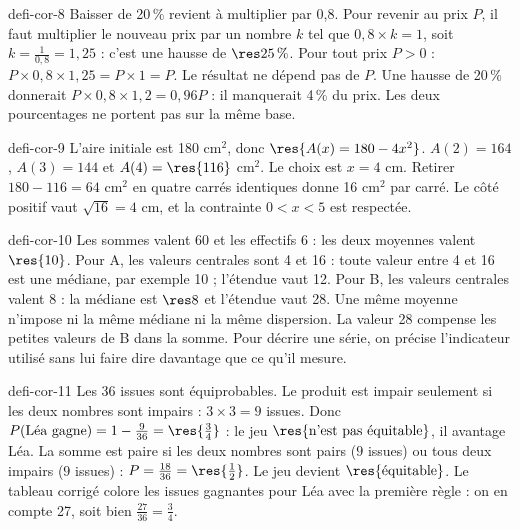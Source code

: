 \begin{blocEdition}{defi-cor-8}
Baisser de 20\,\% revient à multiplier par 0,8. Pour revenir au prix $P$, il faut multiplier le nouveau prix par un nombre $k$ tel que $0{,}8\times k=1$, soit $k=\frac1{0{,}8}=1{,}25$ : c’est une hausse de $\res{25\,\%}$.
Pour tout prix $P>0$ : $P\times0{,}8\times1{,}25=P\times1=P$. Le résultat ne dépend pas de $P$.
Une hausse de 20\,\% donnerait $P\times0{,}8\times1{,}2=0{,}96P$ : il manquerait 4\,\% du prix. Les deux pourcentages ne portent pas sur la même base.
\end{blocEdition}
\begin{blocEdition}{defi-cor-9}
L’aire initiale est 180 cm$^2$, donc $\res{A(x)=180-4x^2}$.
$A(2)=164$, $A(3)=144$ et $A(4)=\res{116}$ cm$^2$. Le choix est $x=4$ cm.
Retirer $180-116=64$ cm$^2$ en quatre carrés identiques donne 16 cm$^2$ par carré. Le côté positif vaut $\sqrt{16}=4$ cm, et la contrainte $0<x<5$ est respectée.\label{fig-defi-cor-9}

\end{blocEdition}
\begin{blocEdition}{defi-cor-10}
Les sommes valent 60 et les effectifs 6 : les deux moyennes valent $\res{10}$.
Pour A, les valeurs centrales sont 4 et 16 : toute valeur entre 4 et 16 est une médiane, par exemple 10 ; l’étendue vaut 12. Pour B, les valeurs centrales valent 8 : la médiane est $\res8$ et l’étendue vaut 28.
Une même moyenne n’impose ni la même médiane ni la même dispersion. La valeur 28 compense les petites valeurs de B dans la somme. Pour décrire une série, on précise l’indicateur utilisé sans lui faire dire davantage que ce qu’il mesure.
\end{blocEdition}
\begin{blocEdition}{defi-cor-11}
Les 36 issues sont équiprobables. Le produit est impair seulement si les deux nombres sont impairs : $3\times3=9$ issues. Donc $P(\text{Léa gagne})=1-\frac9{36}=\res{\frac34}$ : le jeu $\res{\text{n’est pas équitable}}$, il avantage Léa.
La somme est paire si les deux nombres sont pairs ($9$ issues) ou tous deux impairs ($9$ issues) : $P=\frac{18}{36}=\res{\frac12}$. Le jeu devient $\res{\text{équitable}}$.
Le tableau corrigé colore les issues gagnantes pour Léa avec la première règle : on en compte 27, soit bien $\frac{27}{36}=\frac34$.\label{fig-defi-cor-11}

\end{blocEdition}
